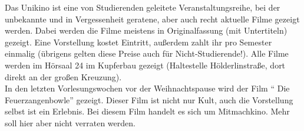 Das Unikino ist eine von Studierenden geleitete Veranstaltungsreihe, bei der
unbekannte und in Vergessenheit geratene, aber auch recht aktuelle Filme
gezeigt werden. Dabei werden die Filme meistens in Originalfassung (mit
Untertiteln) gezeigt. Eine Vorstellung kostet  Eintritt, außerdem zahlt
ihr pro Semester einmalig  (übrigens gelten diese Preise auch für
Nicht-Studierende!). Alle Filme werden im Hörsaal 24 im Kupferbau gezeigt
(Haltestelle Hölderlinstraße, dort direkt an der großen Kreuzung).\\ 
In den letzten Vorlesungswochen vor der Weihnachtspause wird der Film 
"` Die Feu\-er\-zang\-en\-bow\-le"' gezeigt. Dieser Film ist nicht nur Kult,
auch die Vorstellung selbst ist ein Erlebnis. Bei diesem Film handelt es sich 
um Mitmachkino. Mehr soll hier aber nicht verraten werden.


